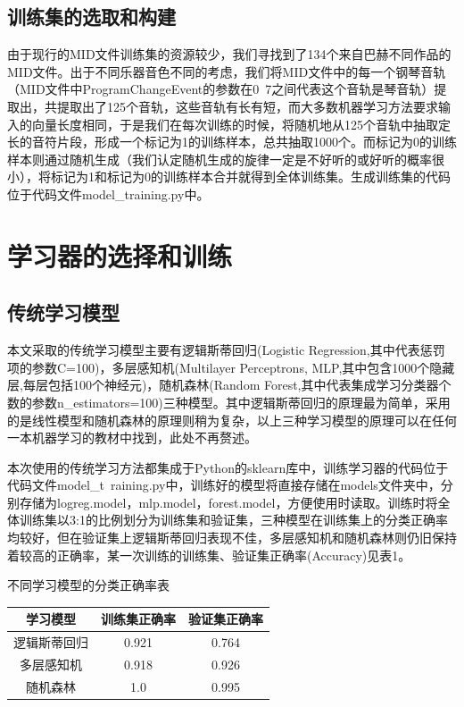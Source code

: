 \documentclass[UTF8,a4paper,10pt]{ctexart}
\begin{document}
    \subsection{训练集的选取和构建}
    由于现行的MID文件训练集的资源较少，我们寻找到了134个来自巴赫不同作品的MID文件。出于不同乐器音色不同的考虑，我们将MID文件中的每一个钢琴音轨（MID文件中ProgramChangeEvent的参数在0~7之间代表这个音轨是琴音轨）提取出，共提取出了125个音轨，这些音轨有长有短，而大多数机器学习方法要求输入的向量长度相同，于是我们在每次训练的时候，将随机地从125个音轨中抽取定长的音符片段，形成一个标记为1的训练样本，总共抽取1000个。而标记为0的训练样本则通过随机生成（我们认定随机生成的旋律一定是不好听的或好听的概率很小），将标记为1和标记为0的训练样本合并就得到全体训练集。生成训练集的代码位于代码文件model\_training.py中。


    \section{\textcolor[rgb]{0,0.3,0.6}{学习器的选择和训练}}
    \subsection{传统学习模型}
    本文采取的传统学习模型主要有逻辑斯蒂回归(Logistic Regression,其中代表惩罚项的参数C=100)，多层感知机(Multilayer Perceptrons, MLP,其中包含1000个隐藏层,每层包括100个神经元)，随机森林(Random Forest,其中代表集成学习分类器个数的参数n\_estimators=100)三种模型。其中逻辑斯蒂回归的原理最为简单，采用的是线性模型和随机森林的原理则稍为复杂，以上三种学习模型的原理可以在任何一本机器学习的教材中找到，此处不再赘述。

    本次使用的传统学习方法都集成于Python的sklearn库中，训练学习器的代码位于代码文件model\_t\ raining.py中，训练好的模型将直接存储在models文件夹中，分别存储为logreg.model，mlp.model，forest.model，方便使用时读取。训练时将全体训练集以3:1的比例划分为训练集和验证集，三种模型在训练集上的分类正确率均较好，但在验证集上逻辑斯蒂回归表现不佳，多层感知机和随机森林则仍旧保持着较高的正确率，某一次训练的训练集、验证集正确率(Accuracy)见表1。
    \makeatletter\def\@captype{table}\makeatother
    \begin{center}
    \caption{不同学习模型的分类正确率表}
    \begin{tabular}{ccc}
    \toprule
    学习模型 & 训练集正确率 & 验证集正确率 \\ 
    \midrule
    逻辑斯蒂回归 & 0.921 & 0.764 \\ 
    多层感知机 & 0.918 &  0.926 \\ 
    随机森林 & 1.0 & 0.995 \\ 
    \bottomrule
    \end{tabular}
    \end{center}
\end{document}
